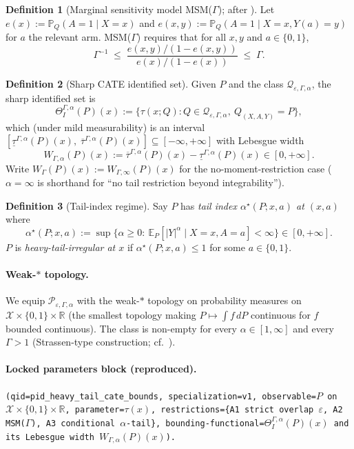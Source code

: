 \documentclass[11pt]{article}
\newcommand{\E}{\mathbb{E}}
\renewcommand{\Pr}{\mathbb{P}}
\newcommand{\R}{\mathbb{R}}
\theoremstyle{definition}
\newtheorem{definition}{Definition}
\theoremstyle{plain}
\theoremstyle{remark}
\begin{document}
\begin{definition}[Marginal sensitivity model MSM($\Gamma$); after \citet{Tan2006MSM}]\label{def:msm}
Let $e(x):=\Pr_Q(A=1\mid X=x)$ and $e(x,y):=\Pr_Q(A=1\mid X=x,Y(a)=y)$ for $a$ the relevant arm. MSM($\Gamma$) requires that for all $x,y$ and $a\in\{0,1\}$,
\[
\Gamma^{-1}\;\le\;\frac{e(x,y)/(1-e(x,y))}{e(x)/(1-e(x))}\;\le\;\Gamma.
\]
\end{definition}

\begin{definition}[Sharp CATE identified set]\label{def:identified-set}
Given $P$ and the class $\mathcal{Q}_{\varepsilon,\Gamma,\alpha}$, the sharp identified set is
\[
\Theta_I^{\Gamma,\alpha}(P)(x):=\{\tau(x;Q):Q\in\mathcal{Q}_{\varepsilon,\Gamma,\alpha},\ Q_{(X,A,Y)}=P\},
\]
which (under mild measurability) is an interval $[\underline{\tau}^{\Gamma,\alpha}(P)(x),\;\overline{\tau}^{\Gamma,\alpha}(P)(x)]\subseteq[-\infty,+\infty]$ with Lebesgue width
\[
W_{\Gamma,\alpha}(P)(x):=\overline{\tau}^{\Gamma,\alpha}(P)(x)-\underline{\tau}^{\Gamma,\alpha}(P)(x)\in[0,+\infty].
\]
Write $W_{\Gamma}(P)(x):=W_{\Gamma,\infty}(P)(x)$ for the no-moment-restriction case ($\alpha=\infty$ is shorthand for ``no tail restriction beyond integrability'').
\end{definition}

\begin{definition}[Tail-index regime]\label{def:tail}
Say $P$ has \emph{tail index $\alpha^{\star}(P;x,a)$ at $(x,a)$} where
\[
\alpha^{\star}(P;x,a):=\sup\{\alpha\ge 0:\ \E_P[|Y|^{\alpha}\mid X=x,A=a]<\infty\}\in[0,+\infty].
\]
$P$ is \emph{heavy-tail-irregular at $x$} if $\alpha^{\star}(P;x,a)\le 1$ for some $a\in\{0,1\}$.
\end{definition}

\paragraph{Weak-$*$ topology.}
We equip $\mathcal{P}_{\varepsilon,\Gamma,\alpha}$ with the weak-$*$ topology on probability measures on $\mathcal{X}\times\{0,1\}\times\R$ (the smallest topology making $P\mapsto\int f\,dP$ continuous for $f$ bounded continuous). The class is non-empty for every $\alpha\in[1,\infty]$ and every $\Gamma>1$ (Strassen-type construction; cf.\ \citet{Strassen1965}).

\paragraph{Locked parameters block (reproduced).}
\texttt{(qid=pid\_heavy\_tail\_cate\_bounds, specialization=v1, observable=$P$ on $\mathcal{X}\times\{0,1\}\times\R$, parameter=$\tau(x)$, restrictions=\{A1 strict overlap $\varepsilon$, A2 MSM($\Gamma$), A3 conditional $\alpha$-tail\}, bounding-functional=$\Theta_I^{\Gamma,\alpha}(P)(x)$ and its Lebesgue width $W_{\Gamma,\alpha}(P)(x)$).}
\end{document}

